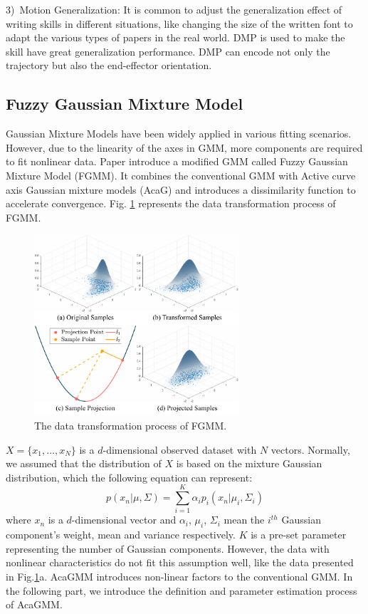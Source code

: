 \documentclass[journal]{IEEEtran}
\begin{document}
3)~Motion Generalization: It is common to adjust the generalization effect of writing skills in different situations, like changing the size of the written font to adapt the various types of papers in the real world. DMP is used to make the skill have great generalization performance. DMP can encode not only the trajectory but also the end-effector orientation.

\subsection{Fuzzy Gaussian Mixture Model}
Gaussian Mixture Models have been widely applied in various fitting scenarios. However, due to the linearity of the axes in GMM, more components are required to fit nonlinear data. Paper \cite{Ju2012} introduce a modified GMM called Fuzzy Gaussian Mixture Model (FGMM). It combines the conventional GMM with Active curve axis Gaussian mixture models (AcaG)\cite{Zhang2005} and introduces a dissimilarity function to accelerate convergence. Fig. \ref{fig2} represents the data transformation process of FGMM.
\begin{figure}[!t]
    \centering
    \includegraphics[width=3in]{./fig/fig2.pdf}
    \caption{The data transformation process of FGMM.}
    \label{fig2}
\end{figure}

$X=\{x_1,\hdots,x_N\}$ is a $d$-dimensional observed dataset with $N$ vectors. Normally, we assumed that the distribution of $X$ is based on the mixture Gaussian distribution, which the following equation can represent:
\begin{equation}
    p(x_n|\mu,\Sigma)=\sum\limits^K_{i=1}\alpha_i p_i(x_n|\mu_i,\Sigma_i)
\end{equation}
where $x_n$ is a $d$-dimensional vector and $\alpha_i$, $\mu_i$, $\Sigma_i$ mean the $i^{th}$ Gaussian component's weight, mean and variance respectively. $K$ is a pre-set parameter representing the number of Gaussian components. However, the data with nonlinear characteristics do not fit this assumption well, like the data presented in Fig.\ref{fig2}a. AcaGMM introduces non-linear factors to the conventional GMM. In the following part, we introduce the definition and parameter estimation process of AcaGMM.
\end{document}
